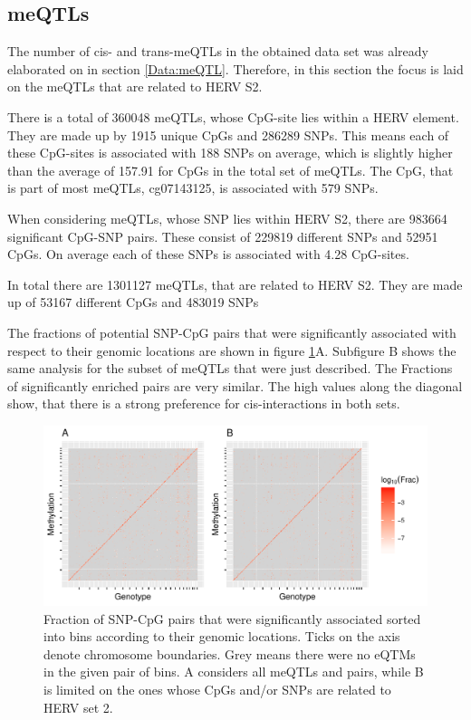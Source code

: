 \documentclass[a4paper,12pt,twoside,openright]{article}
\begin{document}
\subsection{meQTLs}
\label{Results:meQTLs}
The number of cis- and trans-meQTLs in the obtained data set was already elaborated on in section \ref{Data:meQTL}. Therefore, in this section the focus is laid on the meQTLs that are related to HERV S2.

There is a total of 360048 meQTLs, whose CpG-site lies within a HERV element. They are made up by 1915 unique CpGs and 286289 SNPs. This means each of these CpG-sites is associated with 188 SNPs on average, which is slightly higher than the average of 157.91 for CpGs in the total set of meQTLs. The CpG, that is part of most meQTLs, cg07143125, is associated with 579 SNPs. 

When considering meQTLs, whose SNP lies within HERV S2, there are 983664 significant CpG-SNP pairs. These consist of 229819 different SNPs and 52951 CpGs. On average each of these SNPs is associated with 4.28 CpG-sites. 

In total there are 1301127 meQTLs, that are related to HERV S2. They are made up of 53167 different CpGs and 483019 SNPs

The fractions of potential SNP-CpG pairs that were significantly associated with respect to their genomic locations are shown in figure \ref{fig:global.meqtl.heatmap}A. Subfigure B shows the same analysis for the subset of meQTLs that were just described. The Fractions of significantly enriched pairs are very similar. The high values along the diagonal show, that there is a strong preference for cis-interactions in both sets. 

\begin{figure}[tb]
	\includegraphics[scale = 1, keepaspectratio = true]{../figures/meqtl_all_herv_heatmap}  
	\caption{Fraction of SNP-CpG pairs that were significantly associated sorted into bins according to their genomic locations. Ticks on the axis denote chromosome boundaries. Grey means there were no eQTMs in the given pair of bins. A considers all meQTLs and pairs, while B is limited on the ones whose CpGs and/or SNPs are related to HERV set 2.}
    \label{fig:global.meqtl.heatmap}
\end{figure}
\end{document}
